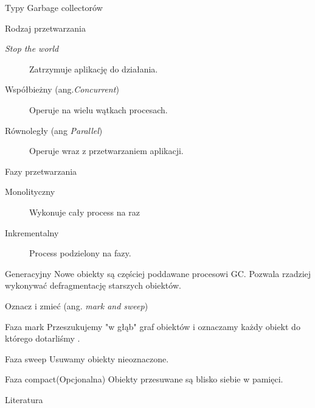 \documentclass{beamer}
\begin{document}
\begin{frame}{Typy Garbage collectorów}
    \begin{block}{Rodzaj przetwarzania}
    \begin{description}
        \item[\textit{Stop the world}] Zatrzymuje aplikację do działania.
        \item[Współbieżny (ang.\textit{Concurrent})] Operuje na wielu wątkach procesach. 
        \item[Równoległy (ang \textit{Parallel})] Operuje wraz z przetwarzaniem aplikacji. 
    \end{description}
   \end{block} 
    \begin{block}{Fazy przetwarzania}
    \begin{description}
        \item[Monolityczny] Wykonuje cały process na raz
        \item[Inkrementalny] Process podzielony na  fazy. 
    \end{description}
   \end{block}
    \begin{block}{Generacyjny}
        Nowe obiekty są częściej poddawane procesowi GC. Pozwala rzadziej wykonywać defragmentację starszych obiektów. 
   \end{block}
\end{frame}

\begin{frame}{Oznacz i zmieć (ang. \textit{mark and sweep})}
    \begin{block}{Faza mark}
        Przeszukujemy "w głąb" graf obiektów i oznaczamy każdy obiekt do którego dotarliśmy \cite{mark-and-sweep}. 
    \end{block}
    \begin{block}{Faza sweep}
        Usuwamy obiekty nieoznaczone.
    \end{block}
        \begin{block}{Faza compact(Opcjonalna)}
        Obiekty przesuwane są blisko siebie w pamięci.
    \end{block}

\end{frame}


\begin{frame}[allowframebreaks]{Literatura}

 
\end{frame}
\end{document}
